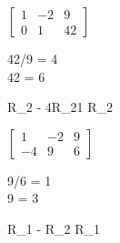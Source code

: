 \documentclass{article}
\begin{document}
{{\begin{minipage}[c]{.33\linewidth}
		\end{minipage}
		
		\begin{minipage}[c]{.20\linewidth}	
			\begin{center}
				$\begin{bmatrix}
					1 & -2 & 9 \\
					0 & 1 & 42
				\end{bmatrix}$ 
			\end{center}			
		\end{minipage}
		\begin{minipage}[c]{.40\linewidth}
			\begin{flalign*}
				42/9 = 4 \\
				42  = 6 	
			\end{flalign*}	
			
		\end{minipage}
		\begin{minipage}[c]{.33\linewidth}
			\begin{flalign*}
				R_{2} - 4R_{21} \rightarrow R_{2}
			\end{flalign*}		
		\end{minipage}
		
		\begin{minipage}[c]{.20\linewidth}	
			\begin{center}
				$\begin{bmatrix}
					1 & -2 & 9 \\
					-4 & 9 & 6
				\end{bmatrix}$ 
			\end{center}			
		\end{minipage}
		\begin{minipage}[c]{.40\linewidth}
			
			\begin{flalign*}
				9/6 = 1 \\
				9 \mod 6 = 3 	
			\end{flalign*}	
			
		\end{minipage}
		\begin{minipage}[c]{.33\linewidth}
			\begin{flalign*}
				R_{1} - R_{2} \rightarrow R_{1}
			\end{flalign*}		
		\end{minipage}
		
}}
\end{document}
